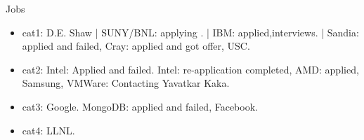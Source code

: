 \begin{block}{Jobs}
  \begin{itemize}
    \tiny \item \tiny cat1: D.E. Shaw | SUNY/BNL: applying . | IBM:
    applied,interviews.  | Sandia: applied and failed, Cray: applied and got offer, USC. 
  \item \tiny cat2: Intel: Applied and failed. Intel: re-application  completed, AMD: applied, Samsung, VMWare: Contacting Yavatkar Kaka. 
  \item \tiny cat3: Google. MongoDB: applied and failed, Facebook. 
  \item \tiny cat4: LLNL. 
  \end{itemize} 
\end{block} 

